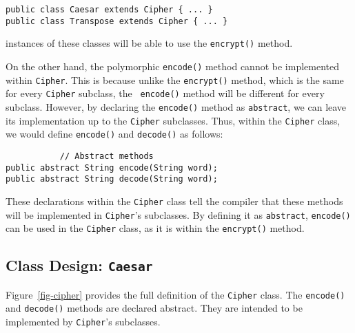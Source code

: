 \begin{jjjlisting}
\begin{lstlisting}
public class Caesar extends Cipher { ... }
public class Transpose extends Cipher { ... }
\end{lstlisting}
\end{jjjlisting}

\noindent instances of these classes will be able to use
the {\tt encrypt()} method.

On the other hand, the polymorphic {\tt encode()} method cannot be
implemented
within {\tt Cipher}. This is because unlike the {\tt encrypt()}
method, which is the same for every {\tt Cipher} subclass, the {\tt
encode()} method will be different for every subclass.  However, by
declaring the {\tt encode()} method as {\tt abstract}, we can leave
its implementation up to the {\tt Cipher} subclasses. Thus, within the
{\tt Cipher} class, we would define {\tt encode()} and {\tt decode()}
as follows:

\begin{jjjlisting}
\begin{lstlisting}
           // Abstract methods
public abstract String encode(String word); 
public abstract String decode(String word);
\end{lstlisting}
\end{jjjlisting}

\noindent These declarations within the {\tt Cipher} class tell the
compiler that these methods will be implemented in {\tt Cipher}'s
subclasses. By defining it as {\tt abstract}, {\tt encode()} can be
used in the {\tt Cipher} class, as it is within the {\tt encrypt()}
method.

\subsection{Class Design: {\tt Caesar} }
\noindent Figure~\ref{fig-cipher} provides the full definition of the
{\tt Cipher} class.  The \mbox{\tt encode()} and {\tt decode()} methods are
declared abstract.  They are intended to be implemented by
{\tt Cipher}'s subclasses.

